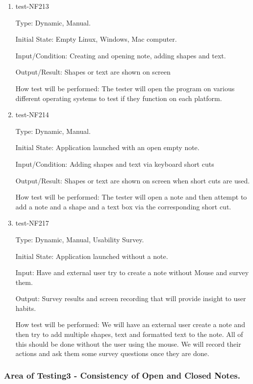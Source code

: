 \documentclass[12pt, titlepage]{article}
\begin{document}
\begin{enumerate}

\item{test-NF213}

Type: Dynamic, Manual.

Initial State: Empty Linux, Windows, Mac computer.

Input/Condition: Creating and opening note, adding shapes and text.

Output/Result: Shapes or text are shown on screen  

How test will be performed: The tester will open the program on various different operating systems to test if they function on each platform. 

\item{test-NF214}

Type: Dynamic, Manual.

Initial State: Application launched with an open empty note.

Input/Condition: Adding shapes and text via keyboard short cuts

Output/Result: Shapes or text are shown on screen when short cuts are used. 

How test will be performed: The tester will open a note and then attempt to add a note and a shape and a text box via the corresponding short cut. 

\item{test-NF217}

Type:  Dynamic, Manual, Usability Survey.

Initial State: Application launched without a note.

Input: Have and external user try to create a note without Mouse and survey them.

Output: Survey results and screen recording that will provide insight to user habits. 

How test will be performed: We will have an external user create a note and then try to add multiple shapes, text and formatted text to the note. All of this should be done without the user using the mouse. We will record their actions and ask them some survey questions once they are done. 

\end{enumerate}

\subsubsection{Area of Testing3 - Consistency of Open and Closed Notes.}
\end{document}
